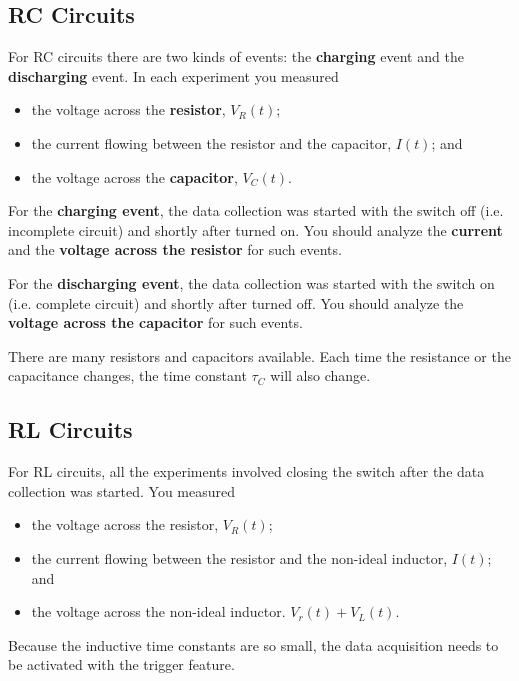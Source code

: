 \subsection{RC Circuits}
For RC circuits there are two kinds of events: the \textbf{charging} event and the \textbf{discharging} event. In each experiment you measured
\begin{itemize}
    \item the voltage across the \textbf{resistor}, $V_{R}(t)$;
    \item the current flowing between the resistor and the capacitor, $I(t)$; and
    \item the voltage across the \textbf{capacitor}, $V_{C}(t)$.
\end{itemize}
For the \textbf{charging event}, the data collection was started with the switch off (i.e. incomplete circuit) and shortly after turned on. You should analyze the \textbf{current} and the \textbf{voltage across the resistor} for such events.

For the \textbf{discharging event}, the data collection was started with the switch on (i.e. complete circuit) and shortly after turned off. You should analyze the \textbf{voltage across the capacitor} for such events.

There are many resistors and capacitors available. Each time the resistance or the capacitance changes, the time constant $\tau_{C}$ will also change.
\subsection{RL Circuits}
For RL circuits, all the experiments involved closing the switch after the data collection was started. You measured
\begin{itemize}
    \item the voltage across the resistor, $V_{R}(t)$;
    \item the current flowing between the resistor and the non-ideal inductor, $I(t)$; and
    \item the voltage across the non-ideal inductor. $V_{r}(t) + V_{L}(t)$.
\end{itemize}
Because the inductive time constants are so small, the data acquisition needs to be activated with the trigger feature.

